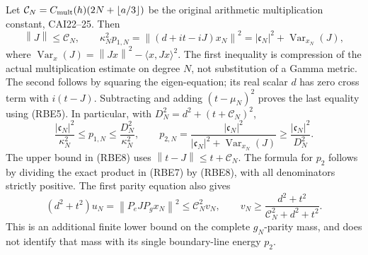 \documentclass[11pt]{article}
\newcommand{\norm}[1]{\left\lVert#1\right\rVert}
\begin{document}
Let \(\mathcal C_N=C_{\rm mult}(h)(2N+\lfloor a/3\rfloor)\)
be the original arithmetic multiplication constant, CAI22--25.
Then
\begin{equation}\tag{RBE8}
 \norm{J}\le\mathcal C_N,\qquad
 \kappa_N^2p_{1,N}
   =\norm{(d+it-iJ)x_N}^2
   =|\mathfrak c_N|^2+\operatorname{Var}_{x_N}(J),
\end{equation}
where \(\operatorname{Var}_{x}(J)=\norm{Jx}^2-\langle x,Jx\rangle^2\).
The first inequality is compression of the actual multiplication
estimate on degree \(N\), not substitution of a Gamma metric.
The second follows by squaring the eigen-equation; its real scalar
\(d\) has zero cross term with \(i(t-J)\). Subtracting and adding
\((t-\mu_N)^2\) proves the last equality using (RBE5).
In particular, with
\(D_N^2=d^2+(t+\mathcal C_N)^2\),
\begin{equation}\tag{RBE9}
 \frac{|\mathfrak c_N|^2}{\kappa_N^2}
 \le p_{1,N}\le\frac{D_N^2}{\kappa_N^2},\qquad
 p_{2,N}=\frac{|\mathfrak c_N|^2}
 {|\mathfrak c_N|^2+\operatorname{Var}_{x_N}(J)}
 \ge\frac{|\mathfrak c_N|^2}{D_N^2}.
\end{equation}
The upper bound in (RBE8) uses \(\norm{t-J}\le t+\mathcal C_N\).
The formula for \(p_2\) follows by dividing the exact product
in (RBE7) by (RBE8), with all denominators strictly positive.
The first parity equation also gives
\begin{equation}\tag{RBE10}
 (d^2+t^2)u_N=\norm{P_eJP_gx_N}^2
   \le\mathcal C_N^2v_N,\qquad
 v_N\ge\frac{d^2+t^2}{\mathcal C_N^2+d^2+t^2}.
\end{equation}
This is an additional finite lower bound on the complete
\(g_N\)-parity mass, and does not identify that mass with its
single boundary-line energy \(p_2\).
\end{document}
